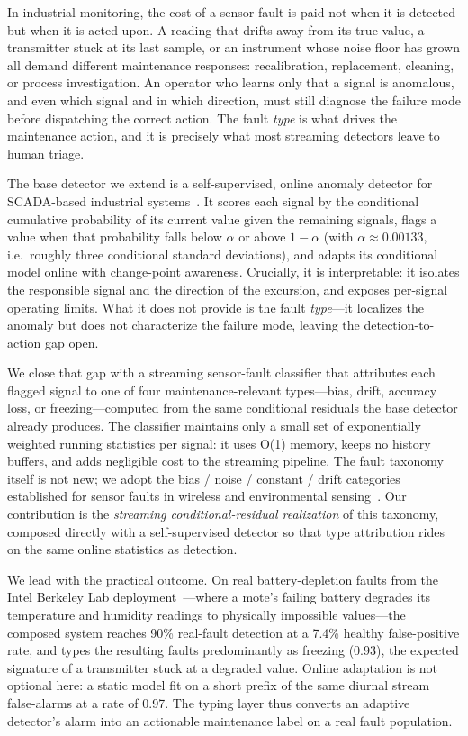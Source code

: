 In industrial monitoring, the cost of a sensor fault is paid not when it is detected but when it is acted upon. A reading that drifts away from its true value, a transmitter stuck at its last sample, or an instrument whose noise floor has grown all demand different maintenance responses: recalibration, replacement, cleaning, or process investigation. An operator who learns only that a signal is anomalous, and even which signal and in which direction, must still diagnose the failure mode before dispatching the correct action. The fault \emph{type} is what drives the maintenance action, and it is precisely what most streaming detectors leave to human triage.

The base detector we extend is a self-supervised, online anomaly detector for SCADA-based industrial systems~\citep{Wadinger2023}. It scores each signal by the conditional cumulative probability of its current value given the remaining signals, flags a value when that probability falls below $\alpha$ or above $1-\alpha$ (with $\alpha \approx 0.00133$, i.e.\ roughly three conditional standard deviations), and adapts its conditional model online with change-point awareness. Crucially, it is interpretable: it isolates the responsible signal and the direction of the excursion, and exposes per-signal operating limits. What it does not provide is the fault \emph{type}---it localizes the anomaly but does not characterize the failure mode, leaving the detection-to-action gap open.

We close that gap with a streaming sensor-fault classifier that attributes each flagged signal to one of four maintenance-relevant types---bias, drift, accuracy loss, or freezing---computed from the same conditional residuals the base detector already produces. The classifier maintains only a small set of exponentially weighted running statistics per signal: it uses O(1) memory, keeps no history buffers, and adds negligible cost to the streaming pipeline. The fault taxonomy itself is not new; we adopt the bias / noise / constant / drift categories established for sensor faults in wireless and environmental sensing~\citep{Sharma2010,Ni2009}. Our contribution is the \emph{streaming conditional-residual realization} of this taxonomy, composed directly with a self-supervised detector so that type attribution rides on the same online statistics as detection.

We lead with the practical outcome. On real battery-depletion faults from the Intel Berkeley Lab deployment~\citep{IntelLab2004}---where a mote's failing battery degrades its temperature and humidity readings to physically impossible values---the composed system reaches 90\% real-fault detection at a 7.4\% healthy false-positive rate, and types the resulting faults predominantly as freezing (0.93), the expected signature of a transmitter stuck at a degraded value. Online adaptation is not optional here: a static model fit on a short prefix of the same diurnal stream false-alarms at a rate of 0.97. The typing layer thus converts an adaptive detector's alarm into an actionable maintenance label on a real fault population.

